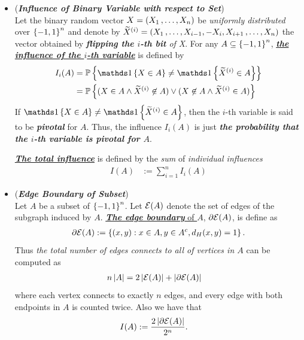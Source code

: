 \documentclass[11pt]{article}
\begin{document}
\begin{itemize}
\item \begin{definition} (\emph{\textbf{Influence of Binary Variable with respect to Set}})\\
Let the binary random vector $X = (X_1 \,{,}\ldots{,}\, X_n)$ be \emph{uniformly distributed} over $\left\{-1, 1\right\}^n$ and denote by $\widetilde{X}^{(i)} = (X_1 \,{,}\ldots{,}\, X_{i-1}, -X_i,  X_{i+1} \,{,}\ldots{,}\, X_{n})$ the vector obtained by \emph{\textbf{flipping the $i$-th bit} of X}. For any $A \subseteq \left\{-1, 1\right\}^n$, \emph{\textbf{\underline{the influence of the $i$-th variable}}} is defined by
\begin{align*}
I_i(A) &= \bP\set{\ind{X \in A} \neq \ind{\widetilde{X}^{(i)} \in A}} \\
&= \bP\set{(X \in A \land \widetilde{X}^{(i)} \not\in A) \lor (X \not\in A \land \widetilde{X}^{(i)} \in A)}
\end{align*} If  $\ind{X \in A} \neq \ind{\widetilde{X}^{(i)} \in A}$, then the $i$-th variable is said to be \emph{\textbf{pivotal}} for $A$. Thus, the influence
$I_i(A)$ is just \textit{\textbf{the probability that the $i$-th variable is pivotal for $A$}}. 

\underline{\textit{\textbf{The total influence}}} is defined by the \emph{sum} of \emph{individual influences}
\begin{align*}
I(A) &:= \sum_{i=1}^{n}I_i(A)
\end{align*}
\end{definition}

\item \begin{definition} (\emph{\textbf{Edge Boundary of  Subset}})\\
Let $A$ be a subset of $\left\{-1, 1\right\}^n$. Let ${\mathcal E}(A)$ denote the set of edges of the subgraph induced by $A$. \underline{\emph{\textbf{The edge boundary}} of $A$}, $\partial {\mathcal E}(A)$, is define as 
\begin{align*}
\partial {\mathcal E}(A) := \left\{(x,y): x \in A, y \in A^{c} , d_H(x, y) = 1\right\}.
\end{align*} Thus \emph{the total number of edges connects to all of vertices in $A$} can be computed as 
\begin{align}
n\left\lvert A \right\rvert &= 2\left\lvert {\mathcal E}(A) \right\rvert + \left\lvert \partial {\mathcal E}(A) \right\rvert \label{eqn: hand_shaking}
\end{align} where each vertex connects to exactly $n$ edges, and every edge with both endpoints in $A$ is counted twice. Also we have that 
\begin{align*}
I(A) &:= \frac{2 \left\lvert \partial {\mathcal E}(A) \right\rvert}{2^n}.
\end{align*}
\end{definition}


\end{itemize}
\end{document}
